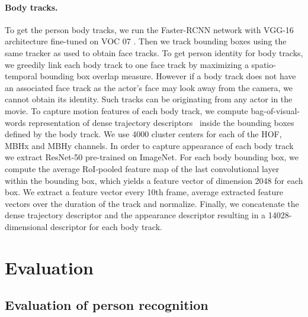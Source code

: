 \documentclass[10pt,twocolumn,letterpaper]{article}
\begin{document}
\paragraph{Body tracks.} \label{bodytracks} 
To get the person body tracks, we run the Faster-RCNN network with VGG-16 architecture fine-tuned on VOC 07 \cite{shaoqingfasterrcnn}. Then we track bounding boxes using the same tracker as used to obtain face tracks.
To get person identity for body tracks, we greedily link each body track to one face track by maximizing a spatio-temporal bounding box overlap measure.
However if a body track does not have an associated face track as the actor's face may look away from the camera, we cannot obtain its identity.
Such tracks can be originating from any actor in the movie. To capture motion features of each body track, we compute bag-of-visual-words representation of dense trajectory descriptors~\cite{wang13action} inside the bounding boxes defined by the body track. We use 4000 cluster centers for each of the HOF, MBHx and MBHy channels.
In order to capture appearance of each body track we extract ResNet-50 \cite{he16resnet} pre-trained on ImageNet. For each body bounding box, we compute the average RoI-pooled \cite{shaoqingfasterrcnn} feature map of the last convolutional
layer within the bounding box, which yields a feature vector of dimension 2048 for each box.
We extract a feature vector every 10th frame, average extracted feature vectors over the duration of the track and  normalize.
Finally, we concatenate the dense trajectory descriptor and the appearance descriptor resulting in a 14028-dimensional descriptor for each body track. 
%
 



\section{Evaluation}

\subsection{Evaluation of person recognition}
\end{document}
